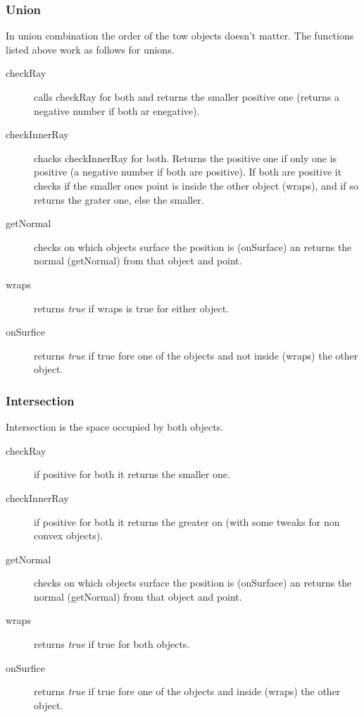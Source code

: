 		\subsubsection{Union}
		
			In union combination the order of the tow objects doesn't matter. The functions listed above work as follows for unions.

			\begin{description}
				\item[checkRay] calls checkRay for both and returns the smaller positive one (returns a negative number if both ar enegative).
				\item[checkInnerRay] chacks checkInnerRay for both. Returns the positive one if only one is positive (a negative number if both are positive). If both are positive it checks if the smaller ones point is inside the other object (wraps), and if so returns the grater one, else the smaller.
				\item[getNormal] checks on which objects surface the position is (onSurface) an returns the normal (getNormal) from that object and point.
				\item[wraps] returns \emph{true} if wraps is true for either object.
				\item[onSurfice] returns \emph{true} if true fore one of the objects and not inside (wraps) the other object.
			\end{description}
		
		\subsubsection{Intersection}
		
			Intersection is the space occupied by both objects.

			\begin{description}
				\item[checkRay] if positive for both it returns the smaller one.
				\item[checkInnerRay] if positive for both it returns the greater on (with some tweaks for non convex objects).
				\item[getNormal] checks on which objects surface the position is (onSurface) an returns the normal (getNormal) from that object and point.
				\item[wraps] returns \emph{true} if true for both objects.
				\item[onSurfice] returns \emph{true} if true fore one of the objects and inside (wraps) the other object.
			\end{description}
		
